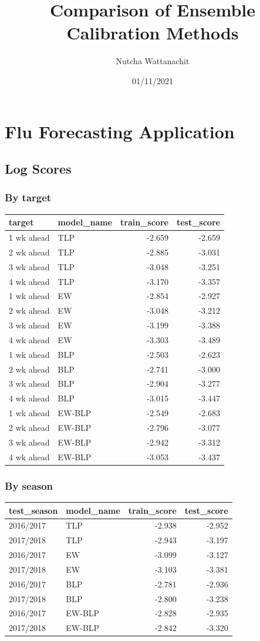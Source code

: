 \documentclass[]{article}
\title{Comparison of Ensemble Calibration Methods}
\author{Nutcha Wattanachit}
\date{01/11/2021}
\begin{document}
\maketitle

\hypertarget{flu-forecasting-application}{%
\section{Flu Forecasting
Application}\label{flu-forecasting-application}}

\hypertarget{log-scores}{%
\subsection{Log Scores}\label{log-scores}}

\hypertarget{by-target}{%
\subsubsection{By target}\label{by-target}}

\begin{longtable}[]{@{}llrr@{}}
\toprule
target & model\_name & train\_score & test\_score\tabularnewline
\midrule
\endhead
1 wk ahead & TLP & -2.659 & -2.659\tabularnewline
2 wk ahead & TLP & -2.885 & -3.031\tabularnewline
3 wk ahead & TLP & -3.048 & -3.251\tabularnewline
4 wk ahead & TLP & -3.170 & -3.357\tabularnewline
1 wk ahead & EW & -2.854 & -2.927\tabularnewline
2 wk ahead & EW & -3.048 & -3.212\tabularnewline
3 wk ahead & EW & -3.199 & -3.388\tabularnewline
4 wk ahead & EW & -3.303 & -3.489\tabularnewline
1 wk ahead & BLP & -2.503 & -2.623\tabularnewline
2 wk ahead & BLP & -2.741 & -3.000\tabularnewline
3 wk ahead & BLP & -2.904 & -3.277\tabularnewline
4 wk ahead & BLP & -3.015 & -3.447\tabularnewline
1 wk ahead & EW-BLP & -2.549 & -2.683\tabularnewline
2 wk ahead & EW-BLP & -2.796 & -3.077\tabularnewline
3 wk ahead & EW-BLP & -2.942 & -3.312\tabularnewline
4 wk ahead & EW-BLP & -3.053 & -3.437\tabularnewline
\bottomrule
\end{longtable}

\hypertarget{by-season}{%
\subsubsection{By season}\label{by-season}}

\begin{longtable}[]{@{}llrr@{}}
\toprule
test\_season & model\_name & train\_score & test\_score\tabularnewline
\midrule
\endhead
2016/2017 & TLP & -2.938 & -2.952\tabularnewline
2017/2018 & TLP & -2.943 & -3.197\tabularnewline
2016/2017 & EW & -3.099 & -3.127\tabularnewline
2017/2018 & EW & -3.103 & -3.381\tabularnewline
2016/2017 & BLP & -2.781 & -2.936\tabularnewline
2017/2018 & BLP & -2.800 & -3.238\tabularnewline
2016/2017 & EW-BLP & -2.828 & -2.935\tabularnewline
2017/2018 & EW-BLP & -2.842 & -3.320\tabularnewline
\bottomrule
\end{longtable}
\end{document}
